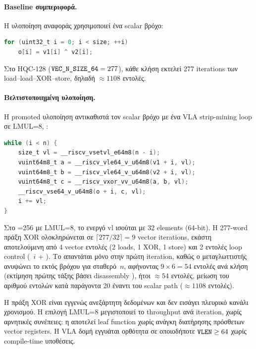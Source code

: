 \paragraph{Baseline συμπεριφορά.}
Η υλοποίηση αναφοράς χρησιμοποιεί ένα scalar βρόχο:

\begin{lstlisting}[language=C, basicstyle=\small\ttfamily]
for (uint32_t i = 0; i < size; ++i)
    o[i] = v1[i] ^ v2[i];
\end{lstlisting}

Στο HQC-128 ($\texttt{VEC\_N\_SIZE\_64} = 277$), κάθε κλήση εκτελεί \num{277}
iterations των load–load–XOR–store, δηλαδή $\approx\num{1108}$ εντολές.

\paragraph{Βελτιστοποιημένη υλοποίηση.}
Η promoted υλοποίηση αντικαθιστά τον scalar βρόχο με ένα \RVV VLA
strip-mining loop σε LMUL=8, :

\begin{lstlisting}[language=C, basicstyle=\small\ttfamily]
while (i < n) {
    size_t vl = __riscv_vsetvl_e64m8(n - i);
    vuint64m8_t a = __riscv_vle64_v_u64m8(v1 + i, vl);
    vuint64m8_t b = __riscv_vle64_v_u64m8(v2 + i, vl);
    vuint64m8_t c = __riscv_vxor_vv_u64m8(a, b, vl);
    __riscv_vse64_v_u64m8(o + i, c, vl);
    i += vl;
}
\end{lstlisting}

Στο \VLEN{}=\num{256} με LMUL=8, το ενεργό $\text{vl}$ ισούται με \num{32}
elements (64-bit). Η \num{277}-word πράξη XOR ολοκληρώνεται σε
$\lceil 277/32 \rceil = 9$ vector iterations, εκάστη αποτελούμενη από
\num{4} vector εντολές (2 loads, 1 XOR, 1 store) και \num{2} εντολές
loop control (~$i$ + ).
Το  απαντάται μόνο στην πρώτη iteration, καθώς ο
μεταγλωττιστής ανυψώνει το  εκτός βρόχου για
σταθερό~$n$, αφήνοντας $9 \times 6 = 54$ εντολές ανά κλήση
(εκτίμηση πρώτης τάξης βάσει disassembly ),
ήτοι $\approx\num{54}$ εντολές,
μείωση του αριθμού εντολών κατά παράγοντα \num{20} έναντι του scalar path ($\approx\num{1108}$ εντολές).

Η πράξη XOR είναι εγγενώς ανεξάρτητη δεδομένων και δεν εισάγει
πλευρικό κανάλι χρονισμού. Η επιλογή LMUL=8 μεγιστοποιεί το
throughput ανά iteration, χωρίς αρνητικές συνέπειες: η 
αποτελεί leaf function χωρίς ανάγκη διατήρησης πρόσθετων vector registers.
Η VLA δομή εγγυάται ορθότητα σε οποιοδήποτε $\texttt{VLEN} \geq 64$ χωρίς
compile-time υποθέσεις.

